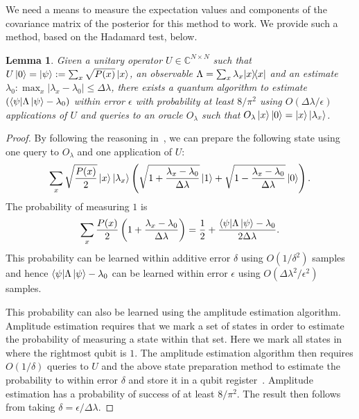 \documentclass[aps,amsmath,onecolumn,amssymb,notitlepage]{revtex4-1}
\newtheorem{lemma}{Lemma}
\begin{document}
We need a means to measure the expectation values and components of the covariance matrix of the posterior for this method to work.  We provide such a method, based on the Hadamard test,  below.

\begin{lemma}
Given a unitary operator $U\in \mathbb{C}^{N\times N}$ such that $U\left|0\right\rangle=\left|\psi\right\rangle:=\sum_x \sqrt{P(x)} \left|x\right\rangle$, an observable $\Lambda=\sum_x \lambda_x |x\rangle\!\langle x|$ and an estimate $\lambda_0:\max_x|\lambda_x-\lambda_0|\le \Delta\lambda$, there exists a quantum algorithm to estimate $(\langle\psi| \Lambda\left|\psi\right\rangle -\lambda_0)$ within error $\epsilon$ with probability at least $8/\pi^2$ using $ O(\Delta\lambda/\epsilon)$ applications of $U$ and queries to an oracle $O_\lambda$ such that $O_\lambda\left|x\right\rangle\left|0\right\rangle= \left|x\right\rangle\left|\lambda_x\right\rangle$.\label{lem:ampest}
\end{lemma}
\begin{proof}
By following the reasoning in~, we can prepare the following state using one query to $O_\lambda$ and one application of $U$:
\begin{equation}
\sum_{x} \sqrt{\frac{P(x)}{2}} \left|x\right\rangle\left|\lambda_x\right\rangle\left(\sqrt{1+\frac{\lambda_x-\lambda_0 }{\Delta \lambda}}\left|1\right\rangle + \sqrt{1-\frac{\lambda_x-\lambda_0 }{\Delta \lambda}}\left|0\right\rangle \right).\label{eq:hadtest}
\end{equation}
The probability of measuring $1$ is 
\begin{equation}
\sum_x \frac{P(x)}{2} \left(1+ \frac{\lambda_x - \lambda_0}{\Delta \lambda} \right)=\frac{1}{2} + \frac{\langle\psi| \Lambda \left|\psi\right\rangle-\lambda_0}{2\Delta \lambda}.\label{eq:mark}
\end{equation}
This probability can be learned within additive error $\delta$ using $O(1/\delta^2)$ samples and hence $\langle\psi| \Lambda \left|\psi\right\rangle-\lambda_0$ can be learned within error $\epsilon$ using $O(\Delta \lambda^2 /\epsilon^2)$ samples.

This probability can also be learned using the amplitude estimation algorithm.  Amplitude estimation requires that we mark a set of states in order to estimate the probability of measuring a state within that set.  Here we mark all states in~ where the rightmost qubit is $1$. The amplitude estimation algorithm then requires $O(1/\delta)$ queries to $U$ and the above state preparation method to estimate the probability to within error $\delta$ and store it in a qubit register~\cite{BHM+02}.  Amplitude estimation has a probability of success of at least $8/\pi^2$.  The result then follows from taking $\delta=\epsilon/\Delta \lambda$.
\end{proof}
\end{document}
